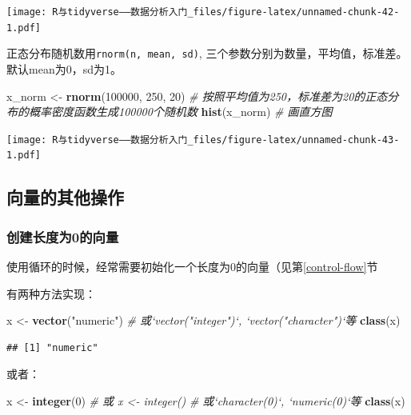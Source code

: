 \documentclass[]{book}
\newenvironment{Shaded}{\begin{snugshade}}{\end{snugshade}}
\newcommand{\CommentTok}[1]{\textcolor[rgb]{0.56,0.35,0.01}{\textit{#1}}}
\newcommand{\DecValTok}[1]{\textcolor[rgb]{0.00,0.00,0.81}{#1}}
\newcommand{\KeywordTok}[1]{\textcolor[rgb]{0.13,0.29,0.53}{\textbf{#1}}}
\newcommand{\NormalTok}[1]{#1}
\newcommand{\StringTok}[1]{\textcolor[rgb]{0.31,0.60,0.02}{#1}}
\begin{document}
\texttt{[image: R与tidyverse——数据分析入门\_files/figure-latex/unnamed-chunk-42-1.pdf]}

正态分布随机数用\texttt{rnorm(n,\ mean,\ sd)}, 三个参数分别为数量，平均值，标准差。默认mean为0，sd为1。

\begin{Shaded}
\begin{Highlighting}[]
\NormalTok{x_norm <-}\StringTok{ }\KeywordTok{rnorm}\NormalTok{(}\DecValTok{100000}\NormalTok{, }\DecValTok{250}\NormalTok{, }\DecValTok{20}\NormalTok{) }\CommentTok{# 按照平均值为250，标准差为20的正态分布的概率密度函数生成100000个随机数}
\KeywordTok{hist}\NormalTok{(x_norm) }\CommentTok{# 画直方图}
\end{Highlighting}
\end{Shaded}

\texttt{[image: R与tidyverse——数据分析入门\_files/figure-latex/unnamed-chunk-43-1.pdf]}

\hypertarget{vector-misc}{%
\subsection{向量的其他操作}\label{vector-misc}}

\hypertarget{vector-length-0}{%
\subsubsection{创建长度为0的向量}\label{vector-length-0}}

使用循环的时候，经常需要初始化一个长度为0的向量（见第\ref{control-flow}节

有两种方法实现：

\begin{Shaded}
\begin{Highlighting}[]
\NormalTok{x <-}\StringTok{ }\KeywordTok{vector}\NormalTok{(}\StringTok{"numeric"}\NormalTok{)}
\CommentTok{# 或`vector("integer")`, `vector("character")`等}
\KeywordTok{class}\NormalTok{(x)}
\end{Highlighting}
\end{Shaded}

\begin{verbatim}
## [1] "numeric"
\end{verbatim}

或者：

\begin{Shaded}
\begin{Highlighting}[]
\NormalTok{x <-}\StringTok{ }\KeywordTok{integer}\NormalTok{(}\DecValTok{0}\NormalTok{)}
\CommentTok{# 或 x <- integer()}
\CommentTok{# 或`character(0)`, `numeric(0)`等}
\KeywordTok{class}\NormalTok{(x)}
\end{Highlighting}
\end{Shaded}
\end{document}
